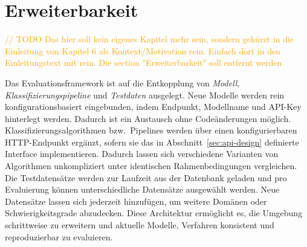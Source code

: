 \section{Erweiterbarkeit}\label{sec:erweiterbarkeit}

\textcolor{orange}{// TODO Das hier soll kein eigenes Kapitel mehr sein, sondern gekürzt in die Einleitung von Kapitel 6 als Kontext/Motivation rein. Einfach dort in den Einleitungstext mit rein. Die section "Erweiterbarkeit" soll entfernt werden}

Das Evaluationsframework ist auf die Entkopplung von \emph{Modell}, \emph{Klassifizierungspipeline} und \emph{Testdaten} ausgelegt. Neue Modelle werden rein konfigurationsbasiert eingebunden, indem Endpunkt, Modellname und API-Key hinterlegt werden. Dadurch ist ein Austausch ohne Codeänderungen möglich. Klassifizierungsalgorithmen bzw.\ Pipelines werden über einen konfigurierbaren HTTP-Endpunkt ergänzt, sofern sie das in Abschnitt~\ref{sec:api-design} definierte Interface implementieren. Dadurch lassen sich verschiedene Varianten von Algorithmen unkompliziert unter identischen Rahmenbedingungen vergleichen. Die Testdatensätze werden zur Laufzeit aus der Datenbank geladen und pro Evaluierung können unterschiedliche Datensätze ausgewählt werden. Neue Datensätze lassen sich jederzeit hinzufügen, um weitere Domänen oder Schwierigkeitsgrade abzudecken. Diese Architektur ermöglicht es, die Umgebung schrittweise zu erweitern und aktuelle Modelle, Verfahren konsistent und reproduzierbar zu evaluieren.

